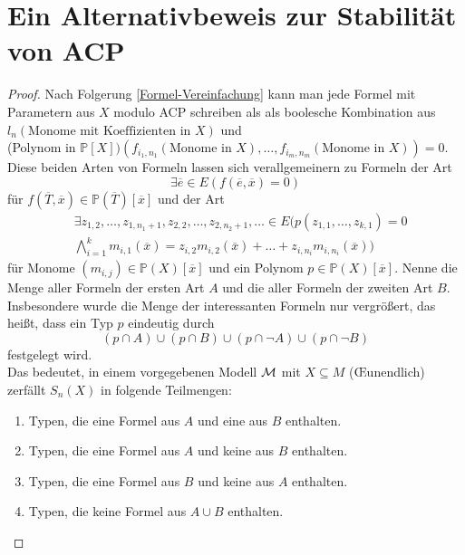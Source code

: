 \renewcommand\thesection{\Alph{section}}
\section{Ein Alternativbeweis zur Stabilität von ACP}

\begin{proof}
	Nach Folgerung \ref{Formel-Vereinfachung} kann man jede Formel mit Parametern aus $X$ modulo ACP schreiben als als boolesche Kombination aus \glqq{}$l_n(\text{Monome mit Koeffizienten in }X)$\grqq{} und\\
	\glqq{}(Polynom in $\mathbb{P}[X])(f_{i_1,n_1}(\text{Monome in }X),\dots,f_{i_m,n_m}(\text{Monome in }X))=0$\grqq{}.\\
	Diese beiden Arten von Formeln lassen sich verallgemeinern
    zu Formeln der Art $${\exists\overline{e}\in E(f(\overline{e},\overline{x})=0)}$$ für  $f(\overline{T},\overline{x})\in\mathbb{P}(\overline{T})[\overline{x}]$ und der Art
	\begin{align*}
	&\exists z_{1,2},\dots,z_{1,n_1+1},z_{2,2},\dots,z_{2,n_2+1},\dots\in E(p(z_{1,1},\dots,z_{k,1})=0\\
	&\bigwedge\limits_{i=1}^km_{i,1}(\overline{x})=z_{i,2}m_{i,2}(\overline{x})+\dots+z_{i,n_i}m_{i,n_i}(\overline{x}))
	\end{align*}
	für Monome $(m_{i,j})\in\mathbb{P}(X)[\overline{x}]$ und ein Polynom $p\in\mathbb{P}(X)[\overline{x}]$. Nenne die Menge aller Formeln der ersten Art $A$ und die aller Formeln der zweiten Art $B$. Insbesondere wurde die Menge der \glqq{}interessanten\grqq{} Formeln nur vergrößert, das heißt, dass ein Typ $p$ eindeutig durch $$(p\cap A)\cup(p\cap B)\cup(p\cap\neg A)\cup(p\cap\neg B)$$ festgelegt wird.\\
	Das bedeutet, in einem vorgegebenen Modell $\mathcal{M}$ mit $X\subseteq M$ (\OE unendlich) zerfällt $S_n(X)$ in folgende Teilmengen:\\
	\begin{enumerate}
		\item Typen, die eine Formel aus $A$ und eine aus $B$ enthalten.
		\item Typen, die eine Formel aus $A$ und keine aus $B$ enthalten.
		\item Typen, die eine Formel aus $B$ und keine aus $A$ enthalten.
		\item Typen, die keine Formel aus $A\cup B$ enthalten.
	\end{enumerate}

\end{proof}
